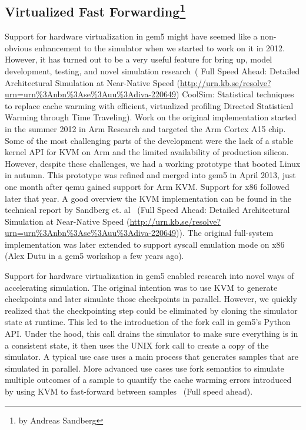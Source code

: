 \subsection[Virtualized Fast Forwarding]{Virtualized Fast Forwarding\footnote{by Andreas Sandberg}}

Support for hardware virtualization in gem5 might have seemed like a non-obvious enhancement to the simulator when we started to work on it in 2012.
However, it has turned out to be a very useful feature for bring up, model development, testing, and novel simulation research~\cite{}(
Full Speed Ahead: Detailed Architectural Simulation at Near-Native Speed (\url{http://urn.kb.se/resolve?urn=urn%3Anbn%3Ase%3Auu%3Adiva-220649})
CoolSim: Statistical techniques to replace cache warming with efficient, virtualized profiling
Directed Statistical Warming through Time Traveling).
Work on the original implementation started in the summer 2012 in Arm Research and targeted the Arm Cortex A15 chip. Some of the most challenging parts of the development were the lack of a stable kernel API for KVM on Arm and the limited availability of production silicon.
However, despite these challenges, we had a working prototype that booted Linux in autumn.
This prototype was refined and merged into gem5 in April 2013, just one month after qemu gained support for Arm KVM.
Support for x86 followed later that year.
A good overview the KVM implementation can be found in the technical report by Sandberg et. al~\cite{} (Full Speed Ahead: Detailed Architectural Simulation at Near-Native Speed (\url{http://urn.kb.se/resolve?urn=urn%3Anbn%3Ase%3Auu%3Adiva-220649})).
The original full-system implementation was later extended to support syscall emulation mode on x86~\cite{} (Alex Dutu in a gem5 workshop a few years ago).

Support for hardware virtualization in gem5 enabled research into novel ways of accelerating simulation.
The original intention was to use KVM to generate checkpoints and later simulate those checkpoints in parallel.
However, we quickly realized that the checkpointing step could be eliminated by cloning the simulator state at runtime.
This led to the introduction of the fork call in gem5’s Python API.
Under the hood, this call drains the simulator to make sure everything is in a consistent state, it then uses the UNIX fork call to create a copy of the simulator.
A typical use case uses a main process that generates samples that are simulated in parallel.
More advanced use cases use fork semantics to simulate multiple outcomes of a sample to quantify the cache warming errors introduced by using KVM to fast-forward between samples~\cite{} (Full speed ahead).
